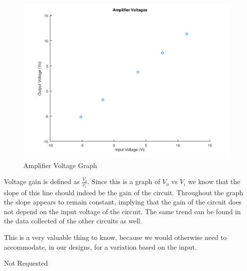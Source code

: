 \documentclass[prb,preprint]{revtex4-1}
\begin{document}
\begin{figure}[ht]
	\centering
	\includegraphics[width=5in]{gainGraph.png}
	\caption{Amplifier Voltage Graph}
	\label{fig4}
\end{figure}

Voltage gain is defined as $\frac{V_{o}}{v_{i}}$. Since this is a graph of $V_{o}$ vs $V_{i}$ we know that the slope of this line should indeed be the gain of the circuit. Throughout the graph the slope appears to remain constant, implying that the gain of the circuit does not depend on the input voltage of the circuit. The same trend can be found in the data collected of the other circuits as well. 

This is a very valuable thing to know, because we would otherwise need to accommodate, in our designs, for a variation based on the input. 

\begin{thebibliography}{99}
Not Requested
\end{thebibliography}
\end{document}
